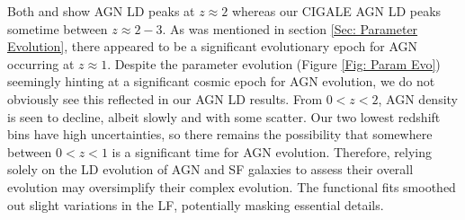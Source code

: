 Both \cite{symeonidis_agn_2021} and \cite{delvecchio_tracing_2014} show AGN LD peaks at $z\approx2$ whereas our CIGALE AGN LD peaks sometime between $z\approx2-3$. As was mentioned in section \ref{Sec: Parameter Evolution}, there appeared to be a significant evolutionary epoch for AGN occurring at $z\approx1$. Despite the parameter evolution (Figure \ref{Fig: Param Evo}) seemingly hinting at a significant cosmic epoch for AGN evolution, we do not obviously see this reflected in our AGN LD results. From $0<z<2$, AGN density is seen to decline, albeit slowly and with some scatter. Our two lowest redshift bins have high uncertainties, so there remains the possibility that somewhere between $0<z<1$ is a significant time for AGN evolution. Therefore, relying solely on the LD evolution of AGN and SF galaxies to assess their overall evolution may oversimplify their complex evolution. The functional fits smoothed out slight variations in the LF, potentially masking essential details.